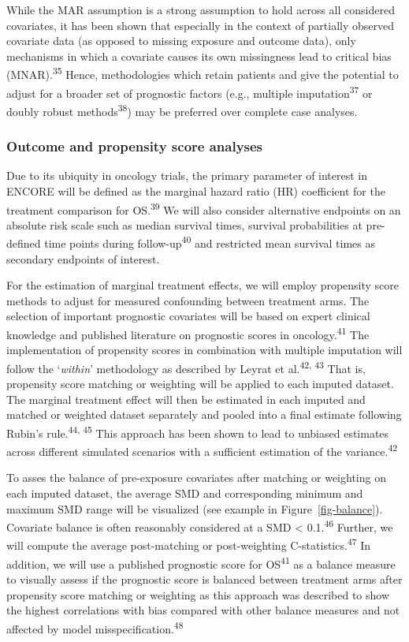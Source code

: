 \documentclass[
  letterpaper,
  DIV=11,
  numbers=noendperiod]{scrartcl}
\begin{document}
While the MAR assumption is a strong assumption to hold across all
considered covariates, it has been shown that especially in the context
of partially observed covariate data (as opposed to missing exposure and
outcome data), only mechanisms in which a covariate causes its own
missingness lead to critical bias (MNAR).\textsuperscript{35} Hence,
methodologies which retain patients and give the potential to adjust for
a broader set of prognostic factors (e.g., multiple
imputation\textsuperscript{37} or doubly robust
methods\textsuperscript{38}) may be preferred over complete case
analyses.

\subsubsection{Outcome and propensity score
analyses}\label{outcome-and-propensity-score-analyses}

Due to its ubiquity in oncology trials, the primary parameter of
interest in ENCORE will be defined as the marginal hazard ratio (HR)
coefficient for the treatment comparison for OS.\textsuperscript{39} We
will also consider alternative endpoints on an absolute risk scale such
as median survival times, survival probabilities at pre-defined time
points during follow-up\textsuperscript{40} and restricted mean survival
times as secondary endpoints of interest.

For the estimation of marginal treatment effects, we will employ
propensity score methods to adjust for measured confounding between
treatment arms. The selection of important prognostic covariates will be
based on expert clinical knowledge and published literature on
prognostic scores in oncology.\textsuperscript{41} The implementation of
propensity scores in combination with multiple imputation will follow
the `\emph{within}' methodology as described by Leyrat et
al.\textsuperscript{42, 43} That is, propensity score matching or
weighting will be applied to each imputed dataset. The marginal
treatment effect will then be estimated in each imputed and matched or
weighted dataset separately and pooled into a final estimate following
Rubin's rule.\textsuperscript{44, 45} This approach has been shown to
lead to unbiased estimates across different simulated scenarios with a
sufficient estimation of the variance.\textsuperscript{42}

To asses the balance of pre-exposure covariates after matching or
weighting on each imputed dataset, the average SMD and corresponding
minimum and maximum SMD range will be visualized (see example in
Figure~\ref{fig-balance}). Covariate balance is often reasonably
considered at a SMD \textless{} 0.1.\textsuperscript{46} Further, we
will compute the average post-matching or post-weighting
C-statistics.\textsuperscript{47} In addition, we will use a published
prognostic score for OS\textsuperscript{41} as a balance measure to
visually assess if the prognostic score is balanced between treatment
arms after propensity score matching or weighting as this approach was
described to show the highest correlations with bias compared with other
balance measures and not affected by model
misspecification.\textsuperscript{48}
\end{document}
